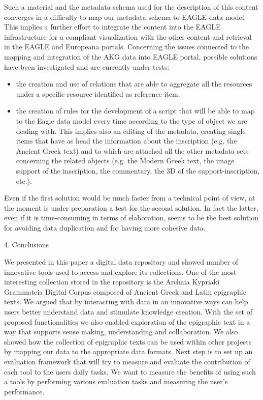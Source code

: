 \documentclass[amsthm,ebook]{saparticle}
\begin{document}
Such a material and the metadata schema used for the description of this content converges in a difficulty to map our
metadata schema to EAGLE data model. This implies a further effort to integrate the content into the EAGLE
infrastructure for a compliant visualization with the other content and retrieval in the EAGLE and Europeana portals.
Concerning the issues connected to the mapping and integration of the AKG data into EAGLE portal, possible solutions
have been investigated and are currently under tests:

\begin{itemize}
\item the creation and use of relations that are able to aggregate all the resources under a specific resource
identified as reference item.
\item the creation of rules for the development of a script that will be able to map to the Eagle data model every time
according to the type of object we are dealing with. This implies also an editing of the metadata, creating single
items that have as head the information about the inscription (e.g. the Ancient Greek text) and to which are attached
all the other metadata sets concerning the related objects (e.g. the Modern Greek text, the image support of the
inscription, the commentary, the 3D of the support-inscription, etc.).
\end{itemize}
Even if the first solution would be much faster from a technical point of view, at the moment is under preparation a
test for the second solution. In fact the latter, even if it is time-consuming in terms of elaboration, seems to be the
best solution for avoiding data duplication and for having more cohesive data. \ 

4. Conclusions

We presented in this paper a digital data repository and showed number of innovative tools used to access and explore
its collections. One of the most interesting collection stored in the repository is the Archaia Kypriaki Grammateia
Digital Corpus composed of Ancient Greek and Latin epigraphic texts. We argued that by interacting with data in an
innovative ways can help users better understand data and stimulate knowledge creation. With the set of proposed
functionalities we also enabled exploration of the epigraphic text in a way that supports sense making, understanding
and collaboration. We also showed how the collection of epigraphic texts can be used within other projects by mapping
our data to the appropriate data formats. Next step is to set up an evaluation framework that will try to measure and
evaluate the contribution of each tool to the users daily tasks. We want to measure the benefits of using such a tools
by performing various evaluation tasks and measuring the user's performance. 




\end{document}
